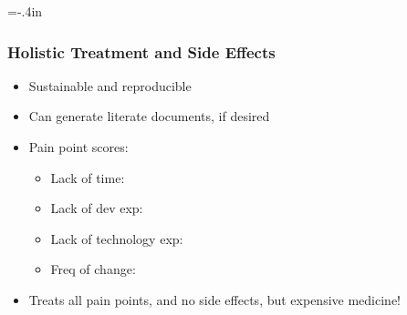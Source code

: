 \documentclass[usenames,dvipsnames]{beamer}
\newcommand{\greencheck}{{\LARGE {\color{ForestGreen}\checkmark}}}
\begin{document}
\hoffset=-.4in %
\begin{frame}[plain]

  
\end{frame}
\hoffset=0in %
  
\begin{frame}
  
  \frametitle{Holistic Treatment and Side Effects}
  
  \begin{itemize}
  \item Sustainable and reproducible
  \item Can generate literate documents, if desired
  \item Pain point scores:
  \begin{itemize}
      \item Lack of time: \greencheck %
      \item Lack of dev exp: \greencheck %
      \item Lack of technology exp: \greencheck %
      \item Freq of change: \greencheck %
  \end{itemize}
  \item Treats all pain points, and no side effects, but expensive medicine!
  \end{itemize}
  
\end{frame}
  
\end{document}
